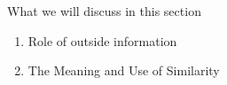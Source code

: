 \documentclass[9pt]{beamer}
\theoremstyle{definition}
\begin{document}


\begin{frame}{What we will discuss in this section}
    \begin{enumerate}
    \item Role of outside information
    \item The Meaning and Use of Similarity 
    \end{enumerate}
\end{frame}


\end{document}
